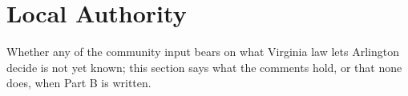 \section{Local Authority}

Whether any of the community input bears on what Virginia law lets Arlington
decide is not yet known; this section says what the comments hold, or that
none does, when Part B is written.


